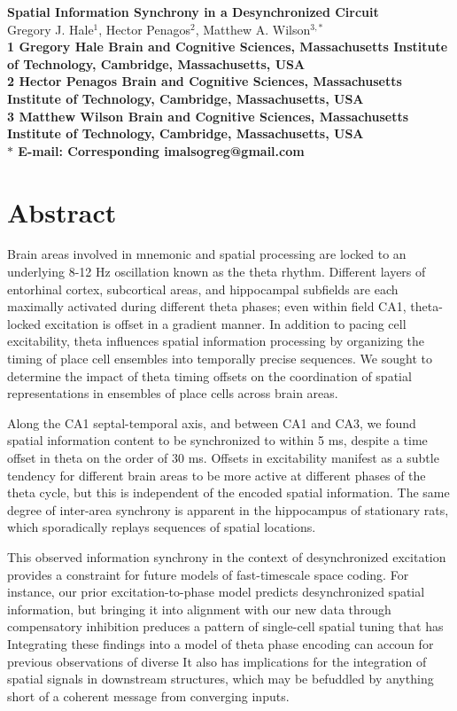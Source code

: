 \documentclass[10pt]{article}
\date{}
\begin{document}
\begin{flushleft}
{\Large
\textbf{Spatial Information Synchrony in a Desynchronized Circuit}
}
\\
Gregory J. Hale$^{1}$, 
Hector Penagos$^{2}$, 
Matthew A. Wilson$^{3,\ast}$
\\
\bf{1} Gregory Hale Brain and Cognitive Sciences, Massachusetts Institute of Technology, Cambridge, Massachusetts, USA
\\
\bf{2} Hector Penagos Brain and Cognitive Sciences, Massachusetts Institute of Technology, Cambridge, Massachusetts, USA
\\
\bf{3} Matthew Wilson Brain and Cognitive Sciences, Massachusetts Institute of Technology, Cambridge, Massachusetts, USA
\\
$\ast$ E-mail: Corresponding imalsogreg@gmail.com
\end{flushleft}

\section*{Abstract}
Brain areas involved in mnemonic and spatial processing are locked to an underlying 8-12 Hz oscillation known as the theta rhythm.  Different layers of entorhinal cortex, subcortical areas, and hippocampal subfields are each maximally activated during different theta phases; even within field CA1, theta-locked excitation is offset in a gradient manner.  In addition to pacing cell excitability, theta influences spatial information processing by organizing the timing of place cell ensembles into temporally precise sequences. We sought to determine the impact of theta timing offsets on the coordination of spatial representations in ensembles of place cells across brain areas.

Along the CA1 septal-temporal axis, and between CA1 and CA3, we found spatial information content to be synchronized to within 5 ms, despite a time offset in theta on the order of 30 ms. Offsets in excitability manifest as a subtle tendency for different brain areas to be more active at different phases of the theta cycle, but this is independent of the encoded spatial information. The same degree of inter-area synchrony is apparent in the hippocampus of stationary rats, which sporadically replays sequences of spatial locations.

This observed information synchrony in the context of desynchronized excitation provides a constraint for future models of fast-timescale space coding. For instance, our prior excitation-to-phase model predicts desynchronized spatial information, but bringing it into alignment with our new data through compensatory inhibition preduces a pattern of single-cell spatial tuning that has 
Integrating these findings into a model of theta phase encoding can accoun for previous observations of diverse It also has implications for the integration of spatial signals in downstream structures, which may be befuddled by anything short of a coherent message from converging inputs.
\end{document}
